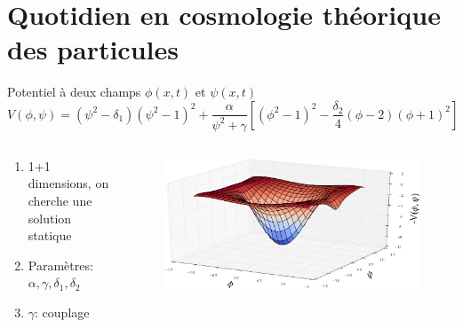 \documentclass[handout]{beamer}
\begin{document}
\section{Quotidien en cosmologie théorique des particules}
\begin{frame}
\begin{block}{Potentiel à deux champs $\phi(x,t)$ et $\psi(x,t)$}
\begin{equation*}
V(\phi,\psi)=(\psi^2-\delta_1)(\psi^2-1)^2+\frac{\alpha}{\psi^2+\gamma}[(\phi^2-1)^2 - \frac{\delta_2}{4}(\phi-2)(\phi+1)^2] 
\end{equation*}

\end{block}
\begin{columns}[T]
    \begin{column}[T]{.5\linewidth}
  
\begin{enumerate}
\item 1+1 dimensions, on cherche une solution statique
\item Paramètres: $\alpha, \gamma, \delta_1, \delta_2$
\item $\gamma$: couplage
\end{enumerate}  
    \end{column}
    \begin{column}[T]{.5\linewidth}
    \begin{figure}[0.3\textwidth]
    \includegraphics[scale=0.2]{Capture-2.png}
    \end{figure}
    \end{column}
  \end{columns}
\end{frame}
\end{document}
